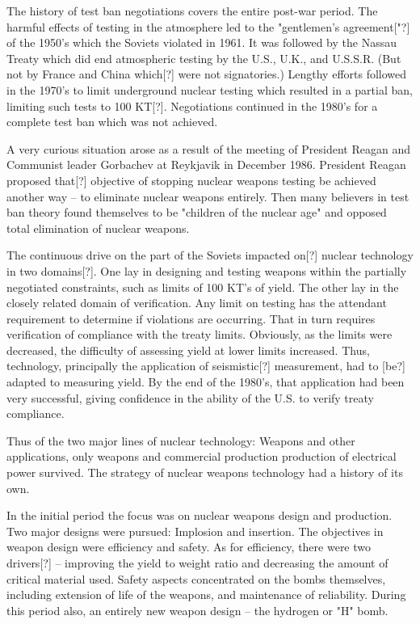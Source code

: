 The history of test ban negotiations covers the entire post-war period. The harmful effects of testing in the atmosphere led to the "gentlemen's agreement["?] of the 1950's which the Soviets violated in 1961. It was followed by the Nassau Treaty which did end atmospheric testing by the U.S., U.K., and U.S.S.R. (But not by France and China which[?] were not signatories.) Lengthy efforts followed in the 1970's to limit underground nuclear testing which resulted in a partial ban, limiting such tests to 100 KT[?]. Negotiations continued in the 1980's for a complete test ban which was not achieved.

A very curious situation arose as a result of the meeting of President Reagan and Communist leader Gorbachev at Reykjavik in December 1986. President Reagan proposed that[?] objective of stopping nuclear weapons testing be achieved another way -- to eliminate nuclear weapons entirely. Then many believers in test ban theory found themselves to be "children of the nuclear age" and opposed total elimination of nuclear weapons.

The continuous drive on the part of the Soviets impacted on[?] nuclear technology in two domains[?]. One lay in designing and testing weapons within the partially negotiated constraints, such as limits of 100 KT's of yield. The other lay in the closely related domain of verification. Any limit on testing has the attendant requirement to determine if violations are occurring. That in turn requires verification of compliance with the treaty limits. Obviously, as the limits were decreased, the difficulty of assessing yield at lower limits increased. Thus, technology, principally the application of seismistic[?] measurement, had to [be?] adapted to measuring yield. By the end of the 1980's, that application had been very successful, giving confidence in the ability of the U.S. to verify treaty compliance.

Thus of the two major lines of nuclear technology: Weapons and other applications, only weapons and commercial production production of electrical power survived. The strategy of nuclear weapons technology had a history of its own.

In the initial period the focus was on nuclear weapons design and production. Two major designs were pursued: Implosion and insertion. The objectives in weapon design were efficiency and safety. As for efficiency, there were two drivers[?] -- improving the yield to weight ratio and decreasing the amount of critical material used. Safety aspects concentrated on the bombs themselves, including extension of life of the weapons, and maintenance of reliability. During this period also, an entirely new weapon design -- the hydrogen or "H" bomb.

